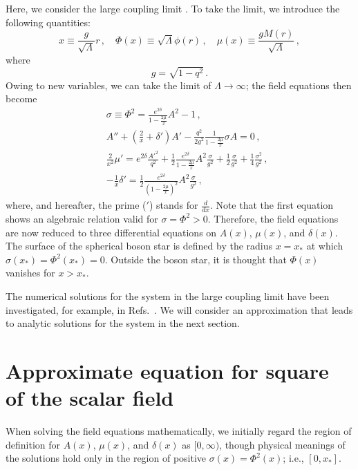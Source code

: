 \documentclass[
aps,prd,
12pt,%
nopreprintnumbers,
showpacs,
eqsecnum,
nofootinbib
]{revtex4-1}
\begin{document}
Here, we consider the large coupling limit \cite{Jetzer,colpi}.
To take the limit, we introduce the following quantities:
\begin{equation}
x\equiv\frac{g}{\sqrt{\Lambda}}r\,,\quad
\Phi(x)\equiv\sqrt{\Lambda}\phi(r)\,,\quad
\mu(x)\equiv\frac{gM(r)}{\sqrt{\Lambda}}\,,
\label{scale}
\end{equation}
where
\begin{equation}
g=\sqrt{1-q^2}\,.
\end{equation}
Owing to new variables, we can take the limit of $\Lambda\rightarrow\infty$;
the field equations then become \cite{Jetzer}
\begin{eqnarray}
& &\sigma\equiv\Phi^2=\frac{e^{2\delta}}{1-\frac{2\mu}{x}}A^2-1\,,
\label{eqeqs}\\
& &A''+\left(\frac{2}{x}+\delta'\right)A'-\frac{q^2}{2g^2}
\frac{1}{1-\frac{2\mu}{x}}\sigma A=0\,,
\label{eqeqa}\\
& &\frac{2}{x^2}\mu'=e^{2\delta}\frac{{A'}^2}{q^2}+\frac{1}{2}
\frac{e^{2\delta}}{1-\frac{2\mu}{x}}A^2\frac{\sigma}{g^2}
+\frac{1}{2}\frac{\sigma}{g^2}+\frac{1}{4}\frac{\sigma^2}{g^2}\,,
\label{eqeqm}\\
& &-\frac{1}{x}\delta'=\frac{1}{2}
\frac{e^{2\delta}}{\left(1-\frac{2\mu}{x}\right)^2}A^2\frac{\sigma}{g^2}\,,
\label{eqeqd}
\end{eqnarray}
where, and hereafter, the prime (${}'$) stands for $\frac{d}{dx}$.
Note that the first equation shows an algebraic relation valid for
$\sigma=\Phi^2>0$. Therefore, the field equations are now reduced to three
differential equations on $A(x)$, $\mu(x)$, and $\delta(x)$.
The surface of the spherical boson star is defined by the radius $x=x_*$ at which
$\sigma(x_*)=\Phi^2(x_*)=0$. Outside the boson star, it is thought that $\Phi(x)$
vanishes for $x>x_*$.

The numerical solutions for the system in the large coupling limit have been
investigated, for example, in Refs.~\cite{Jetzer,JB}.
We will consider an approximation that leads to analytic solutions for the system
in the next section.


\section{Approximate equation for  square of the scalar field}
\label{sec4}
When solving the field equations mathematically, we initially regard the
region of definition for $A(x)$, $\mu(x)$, and $\delta(x)$ as $[0,\infty)$,
though physical meanings of the solutions hold only in the region of positive
$\sigma(x)=\Phi^2(x)$; i.e., $[0, x_*]$.
\end{document}
